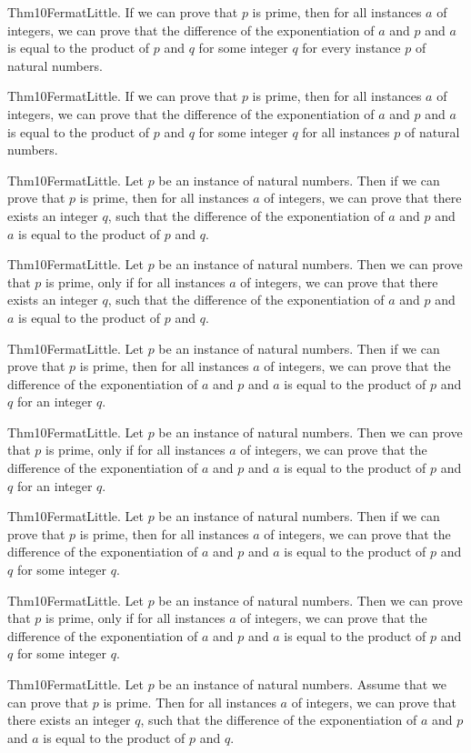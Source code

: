 \documentclass{article}
\begin{document}
Thm10FermatLittle. If we can prove that $p$ is prime, then for all instances $a$ of integers, we can prove that the difference of the exponentiation of $a$ and $p$ and $a$ is equal to the product of $p$ and $q$ for some integer $q$ for every instance $p$ of natural numbers.

Thm10FermatLittle. If we can prove that $p$ is prime, then for all instances $a$ of integers, we can prove that the difference of the exponentiation of $a$ and $p$ and $a$ is equal to the product of $p$ and $q$ for some integer $q$ for all instances $p$ of natural numbers.

Thm10FermatLittle. Let $p$ be an instance of natural numbers. Then if we can prove that $p$ is prime, then for all instances $a$ of integers, we can prove that there exists an integer $q$, such that the difference of the exponentiation of $a$ and $p$ and $a$ is equal to the product of $p$ and $q$.

Thm10FermatLittle. Let $p$ be an instance of natural numbers. Then we can prove that $p$ is prime, only if for all instances $a$ of integers, we can prove that there exists an integer $q$, such that the difference of the exponentiation of $a$ and $p$ and $a$ is equal to the product of $p$ and $q$.

Thm10FermatLittle. Let $p$ be an instance of natural numbers. Then if we can prove that $p$ is prime, then for all instances $a$ of integers, we can prove that the difference of the exponentiation of $a$ and $p$ and $a$ is equal to the product of $p$ and $q$ for an integer $q$.

Thm10FermatLittle. Let $p$ be an instance of natural numbers. Then we can prove that $p$ is prime, only if for all instances $a$ of integers, we can prove that the difference of the exponentiation of $a$ and $p$ and $a$ is equal to the product of $p$ and $q$ for an integer $q$.

Thm10FermatLittle. Let $p$ be an instance of natural numbers. Then if we can prove that $p$ is prime, then for all instances $a$ of integers, we can prove that the difference of the exponentiation of $a$ and $p$ and $a$ is equal to the product of $p$ and $q$ for some integer $q$.

Thm10FermatLittle. Let $p$ be an instance of natural numbers. Then we can prove that $p$ is prime, only if for all instances $a$ of integers, we can prove that the difference of the exponentiation of $a$ and $p$ and $a$ is equal to the product of $p$ and $q$ for some integer $q$.

Thm10FermatLittle. Let $p$ be an instance of natural numbers. Assume that we can prove that $p$ is prime. Then for all instances $a$ of integers, we can prove that there exists an integer $q$, such that the difference of the exponentiation of $a$ and $p$ and $a$ is equal to the product of $p$ and $q$.
\end{document}
